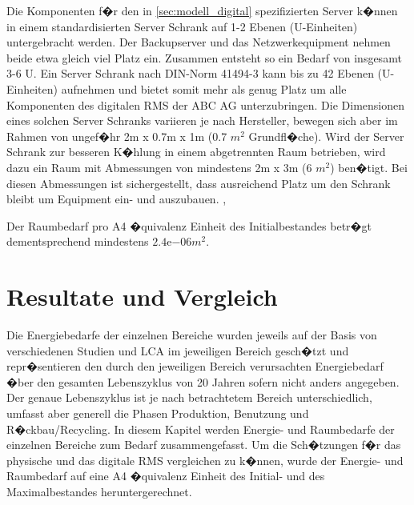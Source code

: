 \documentclass[a4paper,twoside,10pt]{report}
\begin{document}
Die Komponenten f�r den in \ref{sec:modell_digital} spezifizierten Server k�nnen in einem standardisierten Server Schrank auf 1-2 Ebenen (U-Einheiten) untergebracht werden. Der Backupserver und das Netzwerkequipment nehmen beide etwa gleich viel Platz ein. Zusammen entsteht so ein Bedarf von insgesamt 3-6 U. Ein Server Schrank nach DIN-Norm 41494-3 kann bis zu 42 Ebenen (U-Einheiten) aufnehmen und bietet somit mehr als genug Platz um alle Komponenten des digitalen \ac{RMS} der ABC AG unterzubringen. Die Dimensionen eines solchen Server Schranks variieren je nach Hersteller, bewegen sich aber im Rahmen von ungef�hr 2m x 0.7m x 1m (0.7 $m^2$ Grundfl�che). Wird der Server Schrank zur besseren K�hlung in einem abgetrennten Raum betrieben, wird dazu ein Raum mit Abmessungen von mindestens 2m x 3m (6 $m^2$) ben�tigt. Bei diesen Abmessungen ist sichergestellt, dass ausreichend Platz um den Schrank bleibt um Equipment ein- und auszubauen. \cite{42u}, \cite{isorack}

Der Raumbedarf pro A4 �quivalenz Einheit des Initialbestandes betr�gt dementsprechend mindestens $2.4\mathrm{e}{-06} m^2$.

\cleardoublepage
\acresetall
\chapter{Resultate und Vergleich}\label{resultate}
Die Energiebedarfe der einzelnen Bereiche wurden jeweils auf der Basis von verschiedenen Studien und \ac{LCA} im jeweiligen Bereich gesch�tzt und repr�sentieren den durch den jeweiligen Bereich verursachten Energiebedarf �ber den gesamten Lebenszyklus von 20 Jahren sofern nicht anders angegeben. Der genaue Lebenszyklus ist je nach betrachtetem Bereich unterschiedlich, umfasst aber generell die Phasen Produktion, Benutzung und R�ckbau/Recycling. In diesem Kapitel werden Energie- und Raumbedarfe der einzelnen Bereiche zum Bedarf zusammengefasst. Um die Sch�tzungen f�r das physische und das digitale \ac{RMS} vergleichen zu k�nnen, wurde der Energie- und Raumbedarf auf eine A4 �quivalenz Einheit des Initial- und des Maximalbestandes heruntergerechnet.

\end{document}
